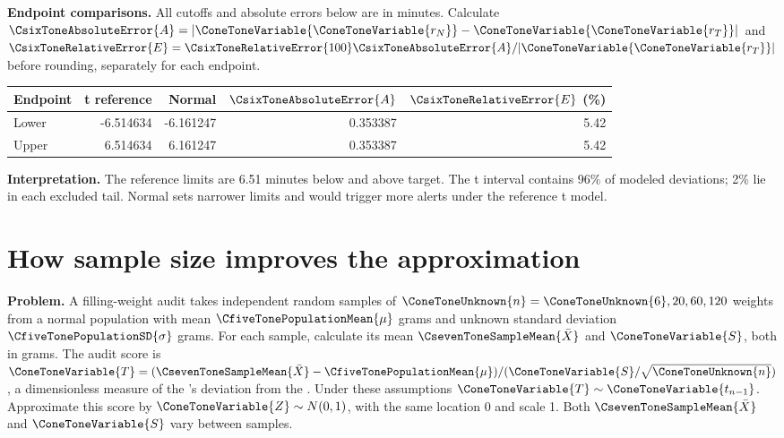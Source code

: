 \textbf{Endpoint comparisons.} All cutoffs and absolute errors below are in minutes. Calculate $\CsixToneAbsoluteError{A}=|\ConeToneVariable{\ConeToneVariable{r_N}}-\ConeToneVariable{\ConeToneVariable{r_T}}|$ and $\CsixToneRelativeError{E}=\CsixToneRelativeError{100}\CsixToneAbsoluteError{A}/|\ConeToneVariable{\ConeToneVariable{r_T}}|$ before rounding, separately for each endpoint.
\begin{center}\begin{tabular}{lrrrr}\toprule Endpoint & t reference & Normal & $\CsixToneAbsoluteError{A}$ & $\CsixToneRelativeError{E}$ (\%)\\\midrule
Lower&-6.514634&-6.161247&0.353387&5.42\\
Upper&6.514634&6.161247&0.353387&5.42\\
\bottomrule\end{tabular}\end{center}
\textbf{Interpretation.} The reference limits are 6.51 minutes below and above target. The t interval contains 96\% of modeled deviations; 2\% lie in each excluded tail. Normal sets narrower limits and would trigger more alerts under the reference t model.


\clearpage\section{How sample size improves the approximation}\label{sec:convergence}
\textbf{Problem.} A filling-weight audit takes independent random samples of $\ConeToneUnknown{n}=\ConeToneUnknown{6},20,60,120$ weights from a normal population with mean $\CfiveTonePopulationMean{\mu}$ grams and unknown standard deviation $\CfiveTonePopulationSD{\sigma}$ grams. For each sample, calculate its mean $\CsevenToneSampleMean{\bar X}$ and    $\ConeToneVariable{S}$, both in grams. The audit score is $\ConeToneVariable{T}=(\CsevenToneSampleMean{\bar X}-\CfiveTonePopulationMean{\mu})/(\ConeToneVariable{S}/\sqrt \ConeToneUnknown{n})$, a dimensionless measure of the  's deviation from the  . Under these assumptions $\ConeToneVariable{T}\sim \ConeToneVariable{t_{n-1}}$. Approximate this score by $\ConeToneVariable{Z}\sim N(0,1)$, with the same location 0 and scale 1. Both $\CsevenToneSampleMean{\bar X}$ and $\ConeToneVariable{S}$ vary between samples.
